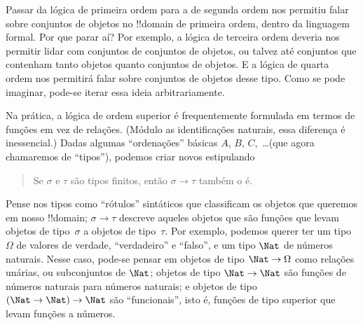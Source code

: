 \documentclass[../../../include/open-logic-section]{subfiles}
\begin{document}


Passar da lógica de primeira ordem para a de segunda ordem nos permitiu
falar sobre conjuntos de objetos no !!{domain} de primeira ordem, dentro da
linguagem formal. Por que parar aí? Por exemplo, a lógica de terceira
ordem deveria nos permitir lidar com conjuntos de conjuntos de objetos,
ou talvez até conjuntos que contenham tanto objetos quanto conjuntos de
objetos. E a lógica de quarta ordem nos permitirá falar sobre conjuntos
de objetos desse tipo. Como se pode imaginar, pode-se iterar essa ideia
arbitrariamente.

Na prática, a lógica de ordem superior é frequentemente formulada em
termos de funções em vez de relações. (Módulo as identificações naturais,
essa diferença é inessencial.) Dadas algumas ``ordenações'' básicas $A$, $B$,
$C$,~\dots (que agora chamaremos de ``tipos''), podemos criar novos
estipulando
\begin{quote}
Se $\sigma$ e $\tau$ são tipos finitos, então $\sigma \to \tau$ também o é.
\end{quote}
Pense nos tipos como ``rótulos'' sintáticos que classificam os objetos que
queremos em nosso !!{domain}; $\sigma \to \tau$ descreve aqueles objetos que
são funções que levam objetos de tipo~$\sigma$ a objetos de
tipo~$\tau$. Por exemplo, podemos querer ter um tipo $\Omega$ de
valores de verdade, ``verdadeiro'' e ``falso'', e um tipo $\Nat$ de números
naturais. Nesse caso, pode-se pensar em objetos de tipo $\Nat \to
\Omega$ como relações unárias, ou subconjuntos de $\Nat$; objetos de tipo
$\Nat \to \Nat$ são funções de números naturais para números naturais;
e objetos de tipo $(\Nat \to \Nat) \to \Nat$ são ``funcionais'',
isto é, funções de tipo superior que levam funções a números.
\end{document}
